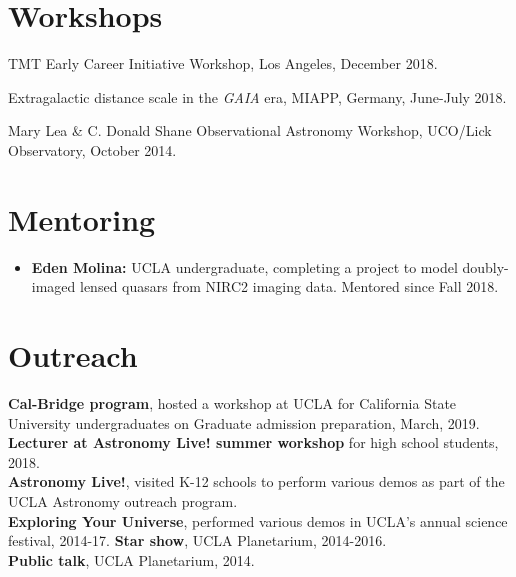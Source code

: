 \documentclass[margin, line]{res}
\begin{document}
\begin{resume}


\section{\sc Workshops}
\begin{etaremune}
	\item TMT Early Career Initiative Workshop, Los Angeles, December 2018.
	\item Extragalactic distance scale in the \textit{GAIA} era, MIAPP, Germany, June-July 2018.
	\item Mary Lea \& C. Donald Shane Observational Astronomy Workshop, UCO/Lick Observatory, October 2014.
\end{etaremune}


%

\section{\sc Mentoring}
\begin{itemize}
	\item \textbf{Eden Molina:} UCLA undergraduate, completing a project to model doubly-imaged lensed quasars from NIRC2 imaging data. Mentored since Fall 2018.
\end{itemize}

\section{\sc Outreach}
{\bf Cal-Bridge program}, hosted a workshop at UCLA for California State University undergraduates on Graduate admission preparation, March, 2019. \\
{\bf Lecturer at Astronomy Live! summer workshop} for high school students, 2018. \\
{\bf Astronomy Live!}, visited K-12 schools to perform various demos as part of the UCLA Astronomy outreach program. \\
{\bf Exploring Your Universe}, performed various demos in UCLA's annual science festival, 2014-17.
{\bf Star show}, UCLA Planetarium, 2014-2016. \\
{\bf Public talk}, UCLA Planetarium, 2014. \\


\end{resume}
\end{document}
